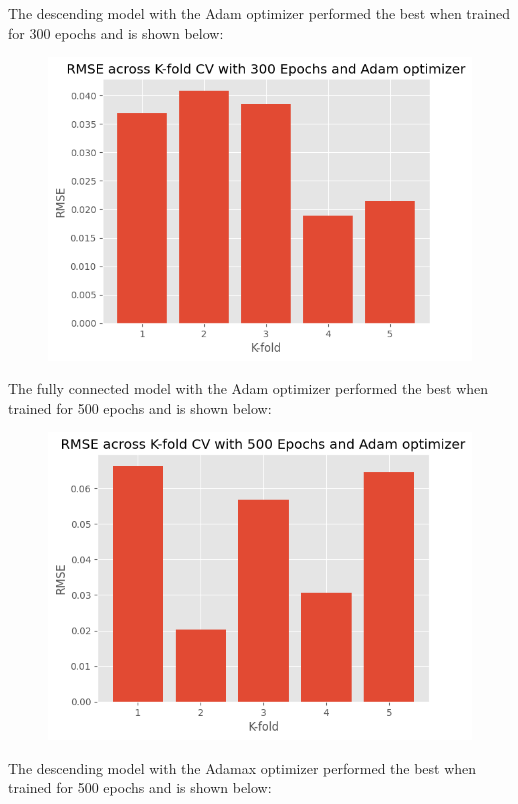 \documentclass[12pt]{article}
\begin{document}
	The descending model with the Adam optimizer performed the best when trained for 300 epochs and is shown below:

	\begin{figure}[H]
		\includegraphics[scale=0.400]{CV_descending_adam.png}
		\centering
	\end{figure}

	The fully connected model with the Adam optimizer performed the best when trained for 500 epochs and is shown below:

	\begin{figure}[H]
		\includegraphics[scale=0.400]{CV_fullconnected_adam.png}
		\centering
	\end{figure}


	The descending model with the Adamax optimizer performed the best when trained for 500 epochs and is shown below:
\end{document}
